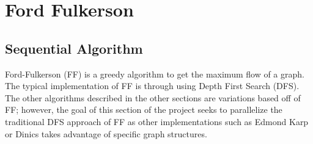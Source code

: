 \section{Ford Fulkerson}

\subsection{Sequential Algorithm}
    Ford-Fulkerson (FF) is a greedy algorithm to get the maximum flow of a graph.  The typical implementation of FF is through using Depth First Search (DFS). The other algorithms described in the other sections are variations based off of FF; however, the goal of this section of the project seeks to parallelize the traditional DFS approach \cite{FFvEk} of FF as other implementations such as Edmond Karp or Dinics takes advantage of specific graph structures.
    \newline
    
